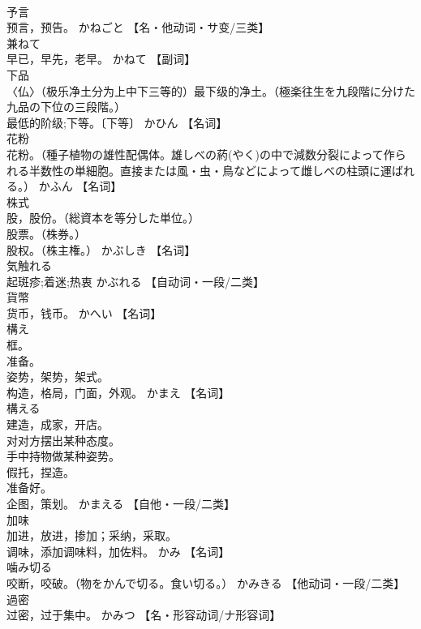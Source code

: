 \documentclass[8pt]{extreport}
\begin{document}
\begin{CJK}{UTF8}{min}
\\	予言	
\\	预言，预告。	かねごと		【名・他动词・サ变/三类】
\\	兼ねて	
\\	早已，早先，老早。	かねて		【副词】
\\	下品	
\\	〈仏〉（极乐净土分为上中下三等的）最下级的净土。（極楽往生を九段階に分けた九品の下位の三段階。） 
\\	最低的阶级;下等。〔下等〕	かひん		【名词】
\\	花粉	
\\	花粉。（種子植物の雄性配偶体。雄しべの葯(やく)の中で減数分裂によって作られる半数性の単細胞。直接または風・虫・鳥などによって雌しべの柱頭に運ばれる。）	かふん		【名词】
\\	株式	
\\	股，股份。（総資本を等分した単位。） 
\\	股票。（株券。） 
\\	股权。（株主権。）	かぶしき		【名词】
\\	気触れる	
\\	起斑疹;着迷;热衷	かぶれる		【自动词・一段/二类】
\\	貨幣	
\\	货币，钱币。	かへい		【名词】
\\	構え	
\\	框。 
\\	准备。 
\\	姿势，架势，架式。 
\\	构造，格局，门面，外观。	かまえ		【名词】
\\	構える	
\\	建造，成家，开店。 
\\	对对方摆出某种态度。 
\\	手中持物做某种姿势。 
\\	假托，捏造。 
\\	准备好。 
\\	企图，策划。	かまえる		【自他・一段/二类】
\\	加味	
\\	加进，放进，掺加；采纳，采取。 
\\	调味，添加调味料，加佐料。	かみ		【名词】
\\	噛み切る	
\\	咬断，咬破。（物をかんで切る。食い切る。）	かみきる		【他动词・一段/二类】
\\	過密	
\\	过密，过于集中。	かみつ		【名・形容动词/ナ形容词】

\end{CJK}
\end{document}
